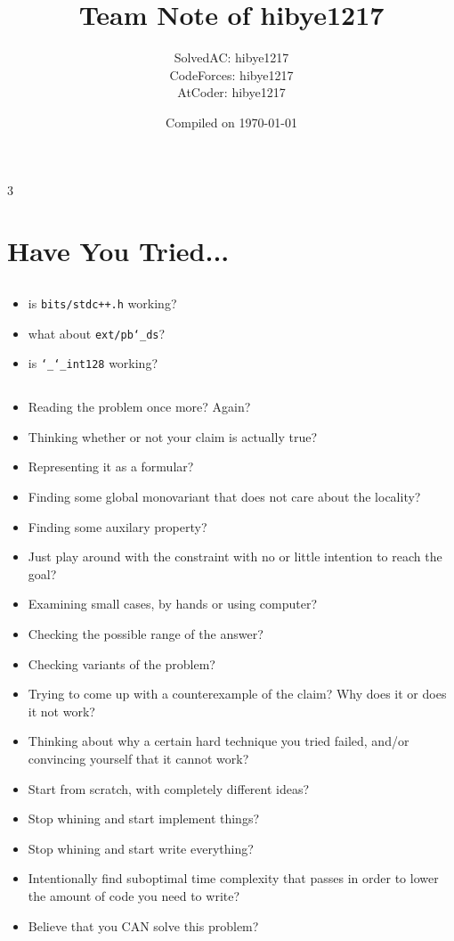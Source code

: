 \documentclass[landscape, 8pt, a4paper, oneside]{extarticle}
\title{Team Note of \textcolor{BOJ_RUBY_IV}{\textbf{hibye1217}}}
\author{SolvedAC: \textcolor{ARENA_SSP}{hibye1217} \\ CodeForces: \textcolor{CF_RED}{hibye1217} \\ AtCoder: \textcolor{AT_YELLOW}{hibye1217}}
\date{Compiled on \today}
\begin{document}
 \begin{multicols*}{3}

\thispagestyle{fancy}
\maketitlepage


\section{Have You Tried...}
\subsection{}
\begin{itemize}
	\item is \texttt{bits/stdc++.h} working?
	\item what about \texttt{ext/pb\char`_ds}?
	\item is \texttt{\char`_\char`_int128} working?
\end{itemize}
\subsection{}
\begin{itemize}
	\item Reading the problem once more? Again?
	\item Thinking whether or not your claim is actually true?
	\item Representing it as a formular?
	\item Finding some global monovariant that does not care about the locality?
	\item Finding some auxilary property?
	\item Just play around with the constraint with no or little intention to reach the goal?
	\item Examining small cases, by hands or using computer?
	\item Checking the possible range of the answer?
	\item Checking variants of the problem?
	\item Trying to come up with a counterexample of the claim? Why does it or does it not work?
	\item Thinking about why a certain hard technique you tried failed, and/or convincing yourself that it cannot work?
	\item Start from scratch, with completely different ideas?
	\item Stop whining and start implement things?
	\item Stop whining and start write everything?
	\item Intentionally find suboptimal time complexity that passes in order to lower the amount of code you need to write?
	\item Believe that you CAN solve this problem?
\end{itemize}

\end{multicols*}
\end{document}
